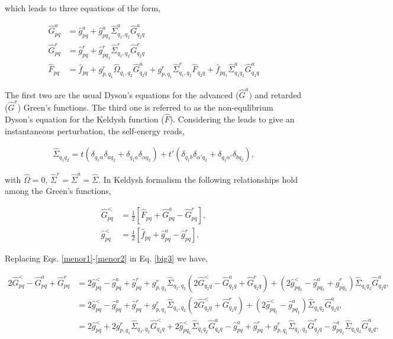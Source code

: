 \documentclass[10pt,prb,showpacs,amssymb,floatfix]{revtex4-1}
\newcommand{\nn}{\nonumber}
\newcommand{\alp}{\alpha}
\newcommand{\dlt}{\delta}
\newcommand{\Og}{\Omega}
\newcommand{\Sg}{\Sigma}
\newcommand{\h}{\hat}
\begin{document}
which leads to three equations of the form,

\begin{align}
\label{big1}
\h{G}^a_{pq} &= \h{g}^a_{pq}  + \h{g}^a_{pq_1}\h {\Sg}^a_{q_1,q_2} \h{G}^a_{q_2 q} \\
\label{big2}
\h G^r_{pq} &= \h g^r_{pq} + \h{g}^r_{pq_1}\h {\Sg}^r_{q_1,q_2} \h{G}^r_{q_2 q} \\
 \h F_{pq} &= \h f_{pq} + g^r_{p,q_1} \h \Og_{q_1,q_2} \h G^a_{q_2 q}  + g^r_{p,q_1} \h \Sg^r_{q_1,q_2} \h F_{q_2 q} + \h f_{pq_1} \h \Sg^a_{q_1q_2} \h{G}^a_{q_2 q}
\label{big3}
\end{align}

The first two are the usual Dyson's equations for the advanced ($\h G^a)$ and retarded ($\h G^r$) Green's functions. The third one is referred to as the non-equlibrium Dyson's equation for the Keldysh function ($\h F$). Considering the leads to give an instantaneous perturbation,\cite{caroli} the self-energy reads,

\begin{align}
\label{qkeself2}
\h \Sg_{q_1q_2} = t (\dlt_{q_1\alp} \dlt_{aq_2} + \dlt_{q_1 a}\dlt_{\alp q_2}) + t' (\dlt_{q_1 b}\dlt_{\alp'q_2} + \dlt_{q_1\alp'}\dlt_{b q_2}),
\end{align}

with $\h \Og = 0$, $\h \Sg^r=\h \Sg^a = \h \Sg$.
In Keldysh formalism the following relationships hold among the Green's functions,

\begin{align}
\label{menor1}
\h G^<_{pq} &= \frac{1}{2 }[\h F_{pq} + \h G^a_{pq} - \h G^r_{pq}], \\
\h g^<_{pq} &= \frac{1}{2 }[\h f_{pq} + \h g^a_{pq} - \h g^r_{pq}]. 
\label{menor2}
\end{align}

Replacing Eqs. \eqref{menor1}-\eqref{menor2} in Eq. \eqref{big3} we have,

\begin{align}
2\h G^<_{pq} -\h G^a_{pq}+\h G^r_{pq} &= 2\h g^<_{pq} -  \h g^a_{pq}  +\h g^r_{pq}  + g^r_{p,q_1} \h \Sg_{q_1,q_2} (2\h G^<_{q_2 q}- \h G^a_{q_2 q}+\h G^r_{q_2 q}) + (2\h g^<_{pq_1} - \h g^a_{pq_1} + \h g^r_{pq_1}  ) \h \Sg_{q_1q_2} \h{G}^a_{q_2 q}, \nn\\
&=2\h g^<_{pq} -  \h g^a_{pq}  +\h g^r_{pq}  + g^r_{p,q_1} \h \Sg_{q_1,q_2} (2\h G^<_{q_2 q}+\h G^r_{q_2 q}) + (2\h g^<_{pq_1} - \h g^a_{pq_1}   ) \h \Sg_{q_1q_2} \h{G}^a_{q_2 q}, \nn\\
&=2\h g^<_{pq} + 2 g^r_{p,q_1} \h \Sg_{q_1,q_2} \h G^<_{q_2 q} + 2\h g^<_{pq_1}\h \Sg_{q_1q_2} \h{G}^a_{q_2 q} -  \h g^a_{pq}  +\h g^r_{pq}  + g^r_{p,q_1} \h \Sg_{q_1,q_2} \h G^r_{q_2 q} - \h g^a_{pq_1}  \h \Sg_{q_1q_2} \h{G}^a_{q_2 q}. 
\label{menor3}
\end{align}
\end{document}
